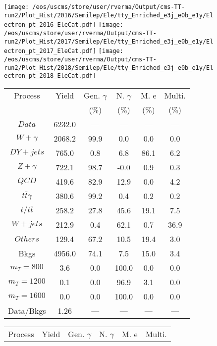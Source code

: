 \begin{figure}
\centering
\texttt{[image: /eos/uscms/store/user/rverma/Output/cms-TT-run2/Plot\_Hist/2016/Semilep/Ele/tty\_Enriched\_e3j\_e0b\_e1y/Electron\_pt\_2016\_EleCat.pdf]}
\texttt{[image: /eos/uscms/store/user/rverma/Output/cms-TT-run2/Plot\_Hist/2017/Semilep/Ele/tty\_Enriched\_e3j\_e0b\_e1y/Electron\_pt\_2017\_EleCat.pdf]}
\texttt{[image: /eos/uscms/store/user/rverma/Output/cms-TT-run2/Plot\_Hist/2018/Semilep/Ele/tty\_Enriched\_e3j\_e0b\_e1y/Electron\_pt\_2018\_EleCat.pdf]}
\begin{minipage}[c]{0.32\textwidth}
\centering
\tiny{
\begin{tabular}{cccccc}
\hline
Process & Yield & Gen. $\gamma$ & N. $\gamma$ & M. e & Multi. \\
 &  & (\%) & (\%) & (\%) & (\%)  \\
\hline
                                                                      $ Data $ &  6232.0 &  --- &  --- &  --- &  ---\\
$ W+\gamma $ &  2068.2 &  99.9 &  0.0 &  0.0 &  0.0\\
$ DY+jets $ &  765.0 &  0.8 &  6.8 &  86.1 &  6.2\\
$ Z+\gamma $ &  722.1 &  98.7 &  -0.0 &  0.9 &  0.3\\
$ QCD $ &  419.6 &  82.9 &  12.9 &  0.0 &  4.2\\
$ t\bar{t}\gamma $ &  380.6 &  99.2 &  0.4 &  0.2 &  0.2\\
$ t/t\bar{t} $ &  258.2 &  27.8 &  45.6 &  19.1 &  7.5\\
$ W+jets $ &  212.9 &  0.4 &  62.1 &  0.7 &  36.9\\
$ Others $ &  129.4 &  67.2 &  10.5 &  19.4 &  3.0\\
Bkgs &  4956.0 &  74.1 &  7.5 &  15.0 &  3.4\\
$ m_{T} = 800 $ &  3.6 &  0.0 &  100.0 &  0.0 &  0.0\\
$ m_{T} = 1200 $ &  0.1 &  0.0 &  96.9 &  3.1 &  0.0\\
$ m_{T} = 1600 $ &  0.0 &  0.0 &  100.0 &  0.0 &  0.0\\
Data/Bkgs &  1.26 &  --- &  --- &  --- &  ---\\
\hline
\end{tabular}
}
\end{minipage}
\begin{minipage}[c]{0.32\textwidth}
\centering
\tiny{
\begin{tabular}{cccccc}
\hline
Process & Yield & Gen. $\gamma$ & N. $\gamma$ & M. e & Multi. \\

\end{tabular}}
\end{minipage}
\end{figure}

